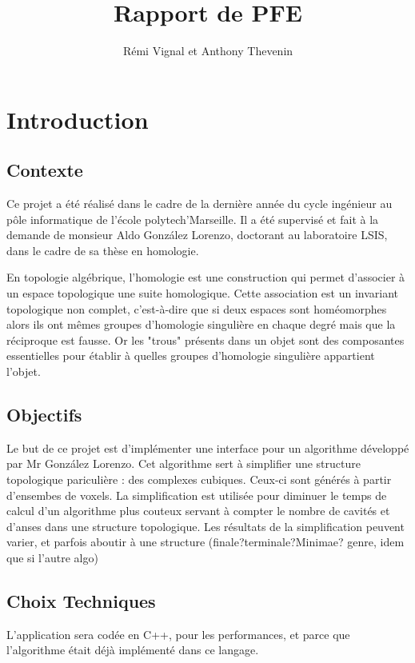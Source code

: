 \documentclass[10pt,a4paper]{report}
\author{Rémi Vignal et Anthony Thevenin}
\title{Rapport de PFE}
\begin{document}
\maketitle

\chapter{Introduction}

\section{Contexte}
Ce projet a été réalisé dans le cadre de la dernière année du cycle ingénieur au pôle informatique de l'école polytech'Marseille. Il a été supervisé et fait à la demande de monsieur Aldo González Lorenzo, doctorant au laboratoire LSIS, dans le cadre de sa thèse en homologie.

En topologie algébrique, l'homologie est une construction qui permet d'associer à un espace topologique une suite homologique. Cette association est un invariant topologique non complet, c'est-à-dire que si deux espaces sont homéomorphes alors ils ont mêmes groupes d'homologie singulière en chaque degré mais que la réciproque est fausse.
Or les "trous" présents dans un objet sont des composantes essentielles pour établir à quelles groupes d'homologie singulière appartient l'objet.
 
\section{Objectifs}
Le but de ce projet est d'implémenter une interface pour un algorithme développé par Mr González Lorenzo.
Cet algorithme sert à simplifier une structure topologique pariculière : des complexes cubiques. Ceux-ci sont générés à partir d'ensembes de voxels. La simplification est utilisée pour diminuer le temps de calcul d'un algorithme plus couteux servant à compter le nombre de cavités et d'anses dans une structure topologique. Les résultats de la simplification peuvent varier, et parfois aboutir à une structure (finale?terminale?Minimae? genre, idem que si l'autre algo)

\section{Choix Techniques}

L'application sera codée en C++, pour les performances, et parce que l'algorithme était déjà implémenté dans ce langage.
\end{document}
